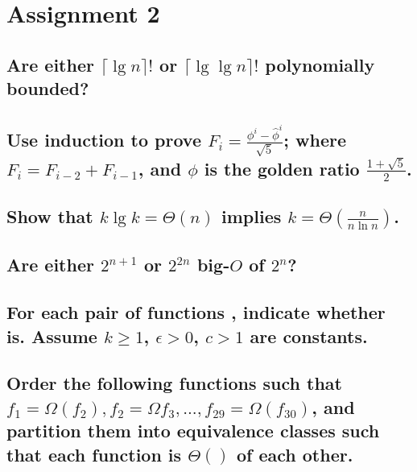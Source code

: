 \chapter{Assignment 2}

\section[Problem 1]{Are either $\lceil \lg n \rceil!$ or $\lceil \lg \lg n \rceil!$ polynomially bounded?}
\section[Problem 2]{Use induction to prove $F_i = \frac{\phi^i - \hat{\phi}^i}{\sqrt{5}}$; where $F_i = F_{i-2} + F_{i-1}$, and $\phi$ is the golden ratio $\frac{1 + \sqrt{5}}{2}$.}
\section[Problem 3]{Show that $k \lg k = \Theta(n)$ implies $k = \Theta\left(\frac{n}{n \ln n}\right)$.}
\section[Problem 4]{Are either $2^{n + 1}$ or $2^{2n}$ big-$O$ of $2^n$?}
\section[Problem 5]{For each pair of functions $ $, indicate whether $ $ is. Assume $k \geq 1$, $\epsilon > 0$, $c > 1$ are constants.}
\section[Problem 6]{Order the following functions such that $f_1 = \Omega(f_2), f_2 = \Omega f_3, ..., f_{29} = \Omega(f_{30})$, and partition them into equivalence classes such that each function is $\Theta()$ of each other.}
